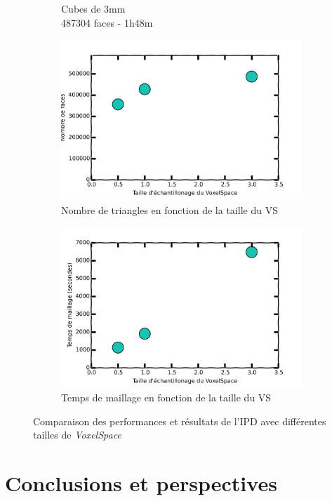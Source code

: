 \documentclass[a4paper,10pt]{report}
\begin{document}
\begin{figure}[h!]
\begin{subfigure}[b]{0.3\textwidth}
        \caption{Cubes de 3mm\\487304 faces - 1h48m}
    \end{subfigure}
    \begin{subfigure}[b]{0.3\textwidth}
	    \includegraphics[width=\textwidth]{results/vs-triangles-cmp.png}
        \caption{Nombre de triangles en fonction de la taille du VS}
    \end{subfigure}
    \begin{subfigure}[b]{0.3\textwidth}
	    \includegraphics[width=\textwidth]{results/vs-time-cmp.png}
        \caption{Temps de maillage en fonction de la taille du VS}
    \end{subfigure}
    \caption{Comparaison des performances et résultats de l'IPD avec différentes tailles de \textit{VoxelSpace}}
\end{figure}

\chapter{Conclusions et perspectives}
\end{document}

